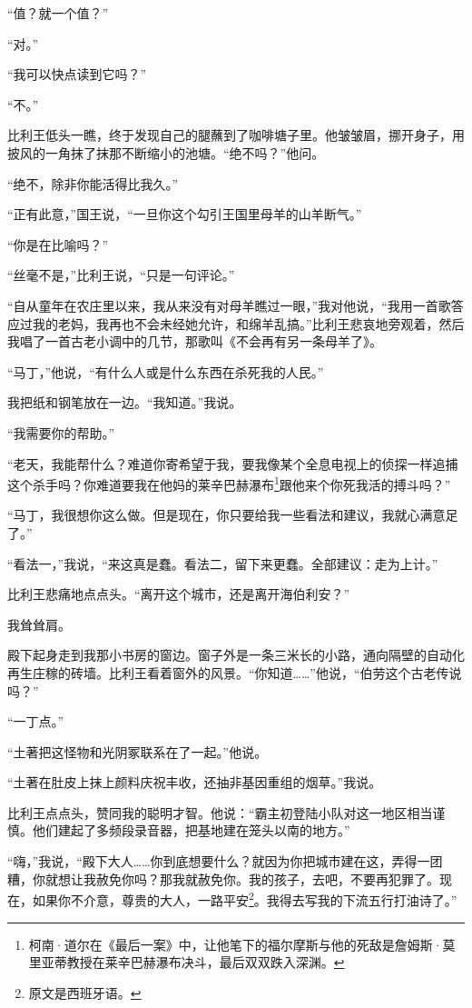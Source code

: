 \documentclass[AutoFakeBold=true]{book}
\begin{document}
``值？就一个值？''

``对。''

``我可以快点读到它吗？''

``不。''

比利王低头一瞧，终于发现自己的腿蘸到了咖啡塘子里。他皱皱眉，挪开身子，用披风的一角抹了抹那不断缩小的池塘。``绝不吗？''他问。

``绝不，除非你能活得比我久。''

``正有此意，''国王说，``一旦你这个勾引王国里母羊的山羊断气。''

``你是在比喻吗？''

``丝毫不是，''比利王说，``只是一句评论。''

``自从童年在农庄里以来，我从来没有对母羊瞧过一眼，''我对他说，``我用一首歌答应过我的老妈，我再也不会未经她允许，和绵羊乱搞。''比利王悲哀地旁观着，然后我唱了一首古老小调中的几节，那歌叫《不会再有另一条母羊了》。

``马丁，''他说，``有什么人或是什么东西在杀死我的人民。''

我把纸和钢笔放在一边。``我知道。''我说。

``我需要你的帮助。''

``老天，我能帮什么？难道你寄希望于我，要我像某个全息电视上的侦探一样追捕这个杀手吗？你难道要我在他妈的莱辛巴赫瀑布\footnote{柯南·道尔在《最后一案》中，让他笔下的福尔摩斯与他的死敌是詹姆斯·莫里亚蒂教授在莱辛巴赫瀑布决斗，最后双双跌入深渊。}跟他来个你死我活的搏斗吗？''

``马丁，我很想你这么做。但是现在，你只要给我一些看法和建议，我就心满意足了。''

``看法一，''我说，``来这真是蠢。看法二，留下来更蠢。全部建议：走为上计。''

比利王悲痛地点点头。``离开这个城市，还是离开海伯利安？''

我耸耸肩。

殿下起身走到我那小书房的窗边。窗子外是一条三米长的小路，通向隔壁的自动化再生庄稼的砖墙。比利王看着窗外的风景。``你知道……''他说，``伯劳这个古老传说吗？''

``一丁点。''

``土著把这怪物和光阴冢联系在了一起。''他说。

``土著在肚皮上抹上颜料庆祝丰收，还抽非基因重组的烟草。''我说。

比利王点点头，赞同我的聪明才智。他说：``霸主初登陆小队对这一地区相当谨慎。他们建起了多频段录音器，把基地建在笼头以南的地方。''

``嗨，''我说，``殿下大人……你到底想要什么？就因为你把城市建在这，弄得一团糟，你就想让我赦免你吗？那我就赦免你。我的孩子，去吧，不要再犯罪了。现在，如果你不介意，尊贵的大人，一路平安\footnote{原文是西班牙语。}。我得去写我的下流五行打油诗了。''
\end{document}
